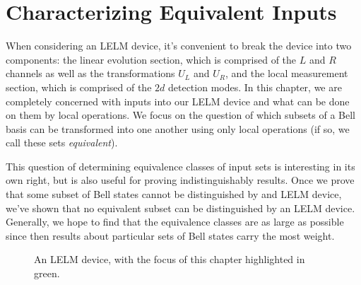 \chapter{Characterizing Equivalent Inputs}

When considering an LELM device, it's convenient to break the device into two components: the linear evolution section, which is comprised of the $L$ and $R$ channels as well as the transformations $U_L$ and $U_R$, and the local measurement section, which is comprised of the $2d$ detection modes. In this chapter, we are completely concerned with inputs into our LELM device and what can be done on them by local operations. We focus on the question of which subsets of a Bell basis can be transformed into one another using only local operations (if so, we call these sets \textit{equivalent}).

This question of determining equivalence classes of input sets is interesting in its own right, but is also useful for proving indistinguishably results. Once we prove that some subset of Bell states cannot be distinguished by and LELM device, we've shown that no equivalent subset can be distinguished by an LELM device. Generally, we hope to find that the equivalence classes are as large as possible since then results about particular sets of Bell states carry the most weight.

\begin{figure}
\centering
{}
\label{fig:inputs}
\caption{An LELM device, with the focus of this chapter highlighted in green.}
\end{figure}

